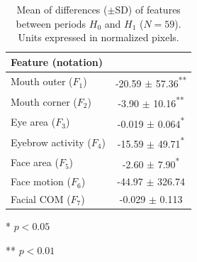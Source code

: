 \begin{table}
    \caption{Mean of differences ($\pm$SD) of features between periods $H_0$ and $H_1$ ($N=59$). Units expressed in normalized pixels.}
    \label{table:changes}
    \centering
    \begin{threeparttable}
        \begin{tabular}{lc}
            \hline
                \textbf{Feature (notation)} &  \\
            \hline
                Mouth outer ($F_1$)      & -20.59 $\pm$ 57.36\textsuperscript{**} \\
                Mouth corner ($F_2$)     & -3.90 $\pm$ 10.16\textsuperscript{**} \\
            \hline
                Eye area ($F_3$)         & -0.019 $\pm$ 0.064\textsuperscript{*} \\
                Eyebrow activity ($F_4$) & -15.59 $\pm$ 49.71\textsuperscript{*} \\
            \hline
                Face area ($F_5$)        & -2.60 $\pm$ 7.90\textsuperscript{*} \\
                Face motion ($F_6$)      & -44.97 $\pm$ 326.74 \\
                Facial COM ($F_7$)       & -0.029 $\pm$ 0.113 \\
            \hline
        \end{tabular}
        \begin{tablenotes}
          \small
          \item[*]{$p < 0.05$}
          \item[**]{$p < 0.01$}
        \end{tablenotes}
    \end{threeparttable}
\end{table}

